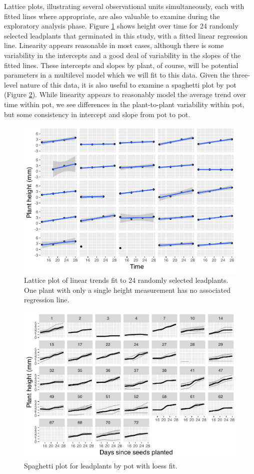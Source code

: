 \documentclass[
]{krantz}
\begin{document}
Lattice plots, illustrating several observational units simultaneously, each with fitted lines where appropriate, are also valuable to examine during the exploratory analysis phase. Figure \ref{fig:lattlpall} shows height over time for 24 randomly selected leadplants that germinated in this study, with a fitted linear regression line. Linearity appears reasonable in most cases, although there is some variability in the intercepts and a good deal of variability in the slopes of the fitted lines. These intercepts and slopes by plant, of course, will be potential parameters in a multilevel model which we will fit to this data. Given the three-level nature of this data, it is also useful to examine a spaghetti plot by pot (Figure \ref{fig:spaglppot}). While linearity appears to reasonably model the average trend over time within pot, we see differences in the plant-to-plant variability within pot, but some consistency in intercept and slope from pot to pot.

\begin{figure}

{\centering \includegraphics[width=0.6\linewidth]{bookdown-BeyondMLR_files/figure-latex/lattlpall-1} 

}

\caption{ Lattice plot of linear trends fit to 24 randomly selected leadplants.  One plant with only a single height measurement has no associated regression line.}\label{fig:lattlpall}
\end{figure}

\begin{figure}

{\centering \includegraphics[width=0.6\linewidth]{bookdown-BeyondMLR_files/figure-latex/spaglppot-1} 

}

\caption{Spaghetti plot for leadplants by pot with loess fit.}\label{fig:spaglppot}
\end{figure}
\end{document}
